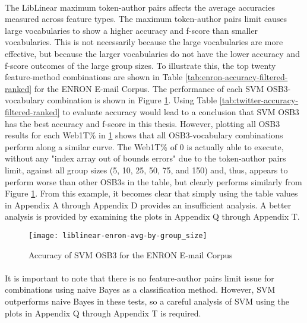 	\paragraph*{} The LibLinear maximum token-author pairs affects the average accuracies measured across feature types. The maximum token-author pairs limit causes large vocabularies to show a higher accuracy and f-score than smaller vocabularies.  This is not necessarily because the large vocabularies are more effective, but because the larger vocabularies do not have the lower accuracy and f-score outcomes of the large group sizes.  To illustrate this, the top twenty feature-method combinations are shown in Table \ref{tab:enron-accuracy-filtered-ranked} for the ENRON E-mail Corpus.  The performance of each SVM OSB3-vocabulary combination is shown in Figure \ref{fig:plot-liblinear-enron-accuracy}. Using Table \ref{tab:twitter-accuracy-filtered-ranked} to evaluate accuracy would lead to a conclusion that SVM OSB3 has the best accuracy and f-score in this thesis.  However, plotting all OSB3 results for each Web1T\%  in \ref{fig:plot-liblinear-enron-accuracy} shows that all OSB3-vocabulary combinations perform along a similar curve.  The Web1T\% of 0 is actually able to execute, without any "index array out of bounds errors" due to the token-author pairs limit, against all group sizes (5, 10, 25, 50, 75, and 150) and, thus, appears to perform worse than other OSB3s in the table, but clearly performs similarly from Figure \ref{fig:plot-liblinear-enron-accuracy}.  From this example, it becomes clear that simply using the table values in Appendix A through Appendix D provides an insufficient analysis.  A better analysis is provided by examining the plots in Appendix Q through Appendix T.  
	
\begin{figure}[htbp!]
	\centering
	\texttt{[image: liblinear-enron-avg-by-group\_size]}
	\caption{Accuracy of SVM OSB3 for the ENRON E-mail Corpus}
	\label{fig:plot-liblinear-enron-accuracy}
\end{figure}
	
	\paragraph*{}It is important to note that there is no feature-author pairs limit issue for combinations using naive Bayes as a classification method.  However, SVM outperforms naive Bayes in these tests, so a careful analysis of SVM using the plots in Appendix Q through Appendix T is required.


